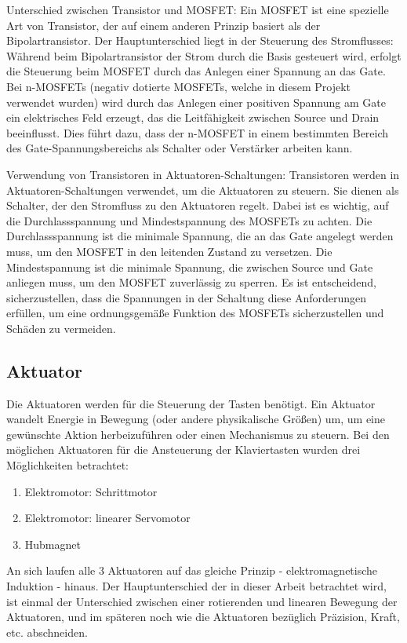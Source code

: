 Unterschied zwischen Transistor und MOSFET: \newline
Ein MOSFET ist eine spezielle Art von Transistor, der auf einem anderen Prinzip basiert als der Bipolartransistor. Der
Hauptunterschied liegt in der Steuerung des Stromflusses: Während beim Bipolartransistor der Strom durch die Basis
gesteuert wird, erfolgt die Steuerung beim MOSFET durch das Anlegen einer Spannung an das Gate.
Bei n-MOSFETs (negativ dotierte MOSFETs, welche in diesem Projekt verwendet wurden) wird durch das Anlegen einer
positiven Spannung am Gate ein
elektrisches Feld erzeugt, das die Leitfähigkeit zwischen Source und Drain beeinflusst. Dies führt dazu, dass der n-MOSFET
in einem bestimmten Bereich des Gate-Spannungsbereichs als Schalter oder Verstärker arbeiten kann. \newline

Verwendung von Transistoren in Aktuatoren-Schaltungen:
Transistoren werden in Aktuatoren-Schaltungen verwendet, um die Aktuatoren
zu steuern. Sie dienen als Schalter, der den Stromfluss zu den Aktuatoren regelt.
Dabei ist es wichtig, auf die Durchlassspannung und Mindestspannung des MOSFETs zu achten. Die Durchlassspannung ist die
minimale Spannung, die an das Gate angelegt werden muss, um den MOSFET in den leitenden Zustand zu versetzen. Die
Mindestspannung ist die minimale Spannung, die zwischen Source und Gate anliegen muss, um den MOSFET zuverlässig zu
sperren.
Es ist entscheidend, sicherzustellen, dass die Spannungen in der Schaltung diese Anforderungen erfüllen, um
eine ordnungsgemäße Funktion des MOSFETs sicherzustellen und Schäden zu vermeiden.

\subsection{Aktuator}\label{subsec:aktuator}
Die Aktuatoren werden für die Steuerung der Tasten benötigt.
Ein Aktuator wandelt Energie in Bewegung (oder andere physikalische Größen) um, um eine gewünschte Aktion herbeizuführen
oder einen Mechanismus zu steuern. \newline %
Bei den möglichen Aktuatoren für die Ansteuerung der Klaviertasten wurden drei Möglichkeiten betrachtet: %
\begin{enumerate}
	\item Elektromotor: Schrittmotor
	\item Elektromotor: linearer Servomotor
	\item Hubmagnet
\end{enumerate}
An sich laufen alle 3 Aktuatoren auf das gleiche Prinzip - elektromagnetische Induktion - hinaus. Der Hauptunterschied
der in dieser Arbeit betrachtet wird, ist einmal der Unterschied zwischen einer rotierenden und linearen Bewegung der Aktuatoren,
und im späteren noch wie die Aktuatoren bezüglich Präzision, Kraft, etc. abschneiden.
